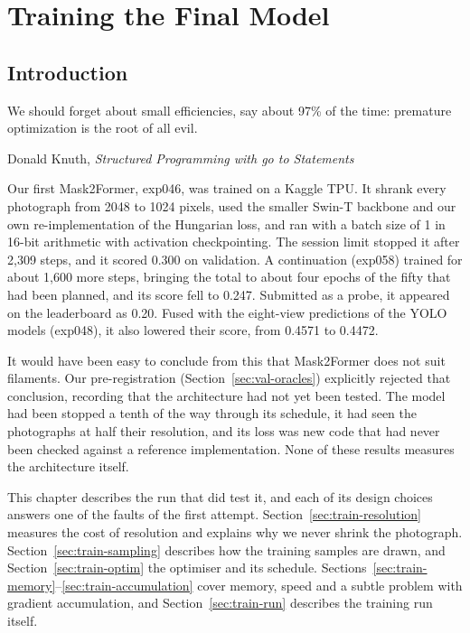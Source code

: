 \chapter{Training the Final Model}\label{ch:training}

\section{Introduction}\label{sec:train-first}
\epigraph{We should forget about small efficiencies, say about 97\% of the time: premature
optimization is the root of all evil.}{Donald Knuth, \emph{Structured Programming with go to
Statements} \citeyearpar{knuth1974}}

Our first Mask2Former, exp046, was trained on a Kaggle TPU. It shrank every photograph from 2048 to
1024 pixels, used the smaller Swin-T backbone and our own re-implementation of the Hungarian loss, and
ran with a batch size of 1 in 16-bit arithmetic with activation checkpointing. The session limit
stopped it after 2,309 steps, and it scored 0.300 on validation. A continuation (exp058) trained for
about 1,600 more steps, bringing the total to about four epochs of the fifty that had been planned,
and its score fell to 0.247. Submitted as a probe, it appeared on the leaderboard as 0.20. Fused with
the eight-view predictions of the YOLO models (exp048), it also lowered their score, from 0.4571 to
0.4472.

It would have been easy to conclude from this that Mask2Former does not suit filaments. Our
pre-registration (Section~\ref{sec:val-oracles}) explicitly rejected that conclusion, recording that
the architecture had not yet been tested. The model had been stopped a tenth of the way through its
schedule, it had seen the photographs at half their resolution, and its loss was new code that had
never been checked against a reference implementation. None of these results measures the
architecture itself.

This chapter describes the run that did test it, and each of its design choices answers one of the
faults of the first attempt. Section~\ref{sec:train-resolution} measures the cost of resolution and
explains why we never shrink the photograph. Section~\ref{sec:train-sampling} describes how the
training samples are drawn, and Section~\ref{sec:train-optim} the optimiser and its schedule.
Sections~\ref{sec:train-memory}--\ref{sec:train-accumulation} cover memory, speed and a subtle
problem with gradient accumulation, and Section~\ref{sec:train-run} describes the training run
itself.


